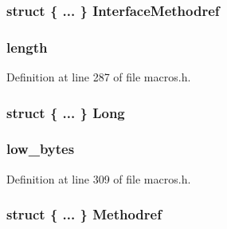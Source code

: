 \subsubsection[{Interface\+Methodref}]{\setlength{\rightskip}{0pt plus 5cm}struct \{ ... \}   Interface\+Methodref}\label{structcp__info_a48b506242a227a148533411c355b8da4}
\hypertarget{structcp__info_ad01efb9db3818b64eae5965bf341710f}{}
\subsubsection[{length}]{ length}\label{structcp__info_ad01efb9db3818b64eae5965bf341710f}


Definition at line 287 of file macros.\+h.

\hypertarget{structcp__info_ae0880f47092712d46f2ba910a15515d0}{}
\subsubsection[{Long}]{\setlength{\rightskip}{0pt plus 5cm}struct \{ ... \}   Long}\label{structcp__info_ae0880f47092712d46f2ba910a15515d0}
\hypertarget{structcp__info_aa98182719e334000a87d75af9d288ff7}{}
\subsubsection[{low\+\_\+bytes}]{ low\+\_\+bytes}\label{structcp__info_aa98182719e334000a87d75af9d288ff7}


Definition at line 309 of file macros.\+h.

\hypertarget{structcp__info_a60a9ed8a2fa437ebd711a9b4dec7e3b1}{}
\subsubsection[{Methodref}]{\setlength{\rightskip}{0pt plus 5cm}struct \{ ... \}   Methodref}\label{structcp__info_a60a9ed8a2fa437ebd711a9b4dec7e3b1}
\hypertarget{structcp__info_adec52fa6971122714e8d390dd4b38048}{}
